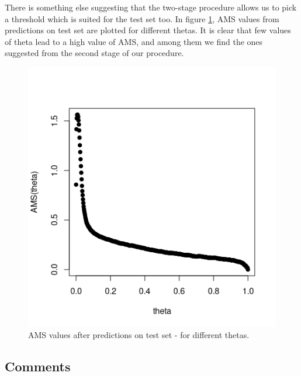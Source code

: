 \documentclass[]{article}
\begin{document}
There is something else suggesting that the two-stage procedure allows us to pick a threshold which is suited for the test set too. In figure \ref{fig: AMS on test}, AMS values from predictions on test set are plotted for different thetas. It is clear that few values of theta lead to a high value of AMS, and among them we find the ones suggested from the second stage of our procedure. 

\begin{figure}[H]
\centering
\label{fig: AMS on test}
\includegraphics[scale=0.7]{../Pictures/testbadpractice.png}
\caption{AMS values after predictions on test set - for different thetas.}
\end{figure}

\subsection{Comments}





\end{document}

